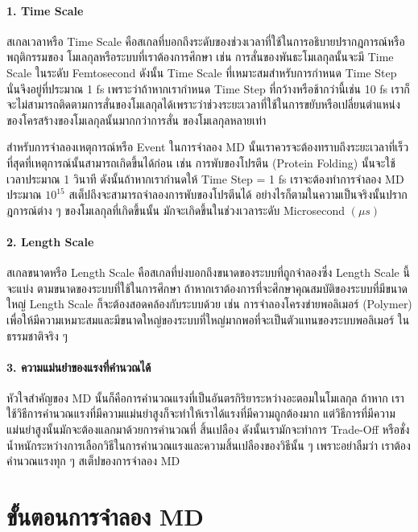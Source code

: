 \paragraph{1. Time Scale} สเกลเวลาหรือ Time Scale คือสเกลที่บอกถึงระดับของช่วงเวลาที่ใช้ในการอธิบายปรากฎการณ์หรือพฤติกรรมของ%
โมเลกุลหรือระบบที่เราต้องการศึกษา เช่น การสั่นของพันธะโมเลกุลนั้นจะมี Time Scale ในระดับ Femtosecond ดังนั้น Time Scale
ที่เหมาะสมสำหรับการกำหนด Time Step นั่นจึงอยู่ที่ประมาณ 1 fs เพราะว่าถ้าหากเรากำหนด Time Step ที่กว้างหรือช้ากว่านี้เช่น 10 fs
เราก็จะไม่สามารถติดตามการสั่นของโมเลกุลได้เพราะว่าช่วงระยะเวลาที่ใช้ในการขยับหรือเปลี่ยนตำแหน่งของโครสร้างของโมเลกุลนั้นมากกว่าการสั่น%
ของโมเลกุลหลายเท่า

สำหรับการจำลองเหตุการณ์หรือ Event ในการจำลอง MD นั้นเราควรจะต้องทราบถึงระยะเวลาที่เร็วที่สุดที่เหตุการณ์นั้นสามารถเกิดขึ้นได้ก่อน เช่น
การพับของโปรตีน (Protein Folding) นั้นจะใช้เวลาประมาณ 1 วินาที ดังนั้นถ้าหากเรากำนดให้ Time Step = 1 fs เราจะต้องทำการจำลอง
MD ประมาณ $10^{15}$ สเต็ปถึงจะสามารถจำลองการพับของโปรตีนได้ อย่างไรก็ตามในความเป็นจริงนั้นปรากฎการณ์ต่าง ๆ ของโมเลกุลที่เกิดขึ้นนั้น%
มักจะเกิดขึ้นในช่วงเวลาระดับ Microsecond $(\mu s)$

\paragraph{2. Length Scale} สเกลขนาดหรือ Length Scale คือสเกลที่บ่งบอกถึงขนาดของระบบที่ถูกจำลองซึ่ง Length Scale นี้จะแบ่ง%
ตามขนาดของระบบที่ใช้ในการศึกษา ถ้าหากเราต้องการที่จะศึกษาคุณสมบัติของระบบที่มีขนาดใหญ่ Length Scale ก็จะต้องสอดคล้องกับระบบด้วย
เช่น การจำลองโครงข่ายพอลิเมอร์ (Polymer) เพื่อให้มีความเหมาะสมและมีขนาดใหญ่ของระบบที่ใหญ่มากพอที่จะเป็นตัวแทนของระบบพอลิเมอร์%
ในธรรมชาติจริง ๆ

\paragraph{3. ความแม่นยำของแรงที่คำนวณได้} หัวใจสำคัญของ MD นั้นก็คือการคำนวณแรงที่เป็นอันตรกิริยาระหว่างอะตอมในโมเลกุล ถ้าหาก%
เราใช้วิธีการคำนวณแรงที่มีความแม่นยำสูงก็จะทำให้เราได้แรงที่มีความถูกต้องมาก แต่วิธีการที่มีความแม่นยำสูงนั้นมักจะต้องแลกมาด้วยการคำนวณที่%
สิ้นเปลือง ดังนั้นเรามักจะทำการ Trade-Off หรือชั่งน้ำหนักระหว่างการเลือกวิธีในการคำนวณแรงและความสิ้นเปลืองของวิธีนั้น ๆ เพราะอย่าลืมว่า%
เราต้องคำนวณแรงทุก ๆ สเต็ปของการจำลอง MD

\section{ขั้นตอนการจำลอง MD}

